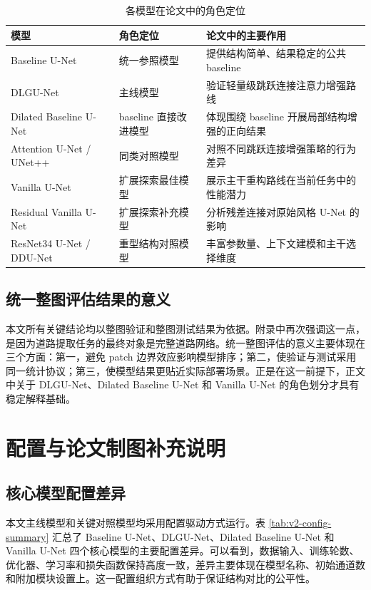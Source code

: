 \begin{table}[htbp]
\centering
\caption{各模型在论文中的角色定位}
\label{tab:v2-role-summary}
\begin{tabular}{p{3.0cm}p{4.2cm}p{5.0cm}}
\toprule
模型 & 角色定位 & 论文中的主要作用 \\
\midrule
Baseline U-Net & 统一参照模型 & 提供结构简单、结果稳定的公共 baseline \\
DLGU-Net & 主线模型 & 验证轻量级跳跃连接注意力增强路线 \\
Dilated Baseline U-Net & baseline 直接改进模型 & 体现围绕 baseline 开展局部结构增强的正向结果 \\
Attention U-Net / UNet++ & 同类对照模型 & 对照不同跳跃连接增强策略的行为差异 \\
Vanilla U-Net & 扩展探索最佳模型 & 展示主干重构路线在当前任务中的性能潜力 \\
Residual Vanilla U-Net & 扩展探索补充模型 & 分析残差连接对原始风格 U-Net 的影响 \\
ResNet34 U-Net / DDU-Net & 重型结构对照模型 & 丰富参数量、上下文建模和主干选择维度 \\
\bottomrule
\end{tabular}
\end{table}

\section{统一整图评估结果的意义}
本文所有关键结论均以整图验证和整图测试结果为依据。附录中再次强调这一点，是因为道路提取任务的最终对象是完整道路网络。统一整图评估的意义主要体现在三个方面：第一，避免 patch 边界效应影响模型排序；第二，使验证与测试采用同一统计协议；第三，使模型结果更贴近实际部署场景。正是在这一前提下，正文中关于 DLGU-Net、Dilated Baseline U-Net 和 Vanilla U-Net 的角色划分才具有稳定解释基础。

\chapter{配置与论文制图补充说明}
\label{app:v2-config}

\section{核心模型配置差异}
本文主线模型和关键对照模型均采用配置驱动方式运行。表 \ref{tab:v2-config-summary} 汇总了 Baseline U-Net、DLGU-Net、Dilated Baseline U-Net 和 Vanilla U-Net 四个核心模型的主要配置差异。可以看到，数据输入、训练轮数、优化器、学习率和损失函数保持高度一致，差异主要体现在模型名称、初始通道数和附加模块设置上。这一配置组织方式有助于保证结构对比的公平性。

